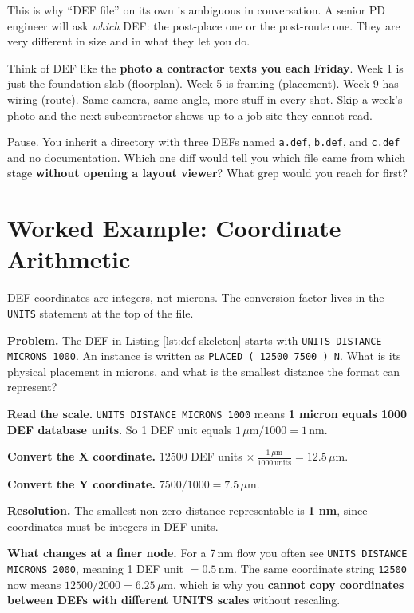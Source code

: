 This is why ``DEF file'' on its own is ambiguous in conversation. A senior PD engineer will ask \emph{which} DEF: the post-place one or the post-route one. They are very different in size and in what they let you do.

\begin{hook}
Think of DEF like the \textbf{photo a contractor texts you each Friday}. Week 1 is just the foundation slab (floorplan). Week 5 is framing (placement). Week 9 has wiring (route). Same camera, same angle, more stuff in every shot. Skip a week's photo and the next subcontractor shows up to a job site they cannot read.
\end{hook}

\begin{pausebox}
Pause. You inherit a directory with three DEFs named \texttt{a.def}, \texttt{b.def}, and \texttt{c.def} and no documentation. Which one diff would tell you which file came from which stage \textbf{without opening a layout viewer}? What grep would you reach for first?
\end{pausebox}

\section{Worked Example: Coordinate Arithmetic}

DEF coordinates are integers, not microns. The conversion factor lives in the \texttt{UNITS} statement at the top of the file.

\textbf{Problem.} The DEF in Listing \ref{lst:def-skeleton} starts with \texttt{UNITS DISTANCE MICRONS 1000}. An instance is written as \texttt{PLACED ( 12500 7500 ) N}. What is its physical placement in microns, and what is the smallest distance the format can represent?

 \textbf{Read the scale.} \texttt{UNITS DISTANCE MICRONS 1000} means \textbf{1 micron equals 1000 DEF database units}. So 1 DEF unit equals \(1\,\mu\text{m}/1000 = 1\,\text{nm}\).

 \textbf{Convert the X coordinate.} \(12500\) DEF units \(\times\, \tfrac{1\,\mu\text{m}}{1000\,\text{units}} = 12.5\,\mu\text{m}\).

 \textbf{Convert the Y coordinate.} \(7500 / 1000 = 7.5\,\mu\text{m}\).

 \textbf{Resolution.} The smallest non-zero distance representable is \textbf{1 nm}, since coordinates must be integers in DEF units.

 \textbf{What changes at a finer node.} For a 7\,nm flow you often see \texttt{UNITS DISTANCE MICRONS 2000}, meaning 1 DEF unit \(= 0.5\,\text{nm}\). The same coordinate string \texttt{12500} now means \(12500/2000 = 6.25\,\mu\text{m}\), which is why you \textbf{cannot copy coordinates between DEFs with different UNITS scales} without rescaling.

